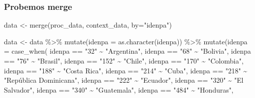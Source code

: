 \documentclass[
  letterpaper,
  DIV=11,
  numbers=noendperiod]{scrartcl}
\newenvironment{Shaded}{\begin{snugshade}}{\end{snugshade}}
\newcommand{\AttributeTok}[1]{\textcolor[rgb]{0.40,0.45,0.13}{#1}}
\newcommand{\FunctionTok}[1]{\textcolor[rgb]{0.28,0.35,0.67}{#1}}
\newcommand{\NormalTok}[1]{\textcolor[rgb]{0.00,0.23,0.31}{#1}}
\newcommand{\OtherTok}[1]{\textcolor[rgb]{0.00,0.23,0.31}{#1}}
\newcommand{\SpecialCharTok}[1]{\textcolor[rgb]{0.37,0.37,0.37}{#1}}
\newcommand{\StringTok}[1]{\textcolor[rgb]{0.13,0.47,0.30}{#1}}
\begin{document}
\subsubsection{Probemos merge}\label{probemos-merge}

\begin{Shaded}
\begin{Highlighting}[]
\NormalTok{data }\OtherTok{\textless{}{-}} \FunctionTok{merge}\NormalTok{(proc\_data, context\_data, }\AttributeTok{by=}\StringTok{"idenpa"}\NormalTok{)}
\end{Highlighting}
\end{Shaded}

\begin{Shaded}
\begin{Highlighting}[]
\NormalTok{data }\OtherTok{\textless{}{-}}\NormalTok{ data }\SpecialCharTok{\%\textgreater{}\%}
  \FunctionTok{mutate}\NormalTok{(}\AttributeTok{idenpa =} \FunctionTok{as.character}\NormalTok{(idenpa)) }\SpecialCharTok{\%\textgreater{}\%}
  \FunctionTok{mutate}\NormalTok{(}\AttributeTok{idenpa =} \FunctionTok{case\_when}\NormalTok{(}
\NormalTok{    idenpa }\SpecialCharTok{==} \StringTok{"32"} \SpecialCharTok{\textasciitilde{}} \StringTok{"Argentina"}\NormalTok{,}
\NormalTok{    idenpa }\SpecialCharTok{==} \StringTok{"68"} \SpecialCharTok{\textasciitilde{}} \StringTok{"Bolivia"}\NormalTok{,}
\NormalTok{    idenpa }\SpecialCharTok{==} \StringTok{"76"} \SpecialCharTok{\textasciitilde{}} \StringTok{"Brasil"}\NormalTok{,}
\NormalTok{    idenpa }\SpecialCharTok{==} \StringTok{"152"} \SpecialCharTok{\textasciitilde{}} \StringTok{"Chile"}\NormalTok{,}
\NormalTok{    idenpa }\SpecialCharTok{==} \StringTok{"170"} \SpecialCharTok{\textasciitilde{}} \StringTok{"Colombia"}\NormalTok{,}
\NormalTok{    idenpa }\SpecialCharTok{==} \StringTok{"188"} \SpecialCharTok{\textasciitilde{}} \StringTok{"Costa Rica"}\NormalTok{,}
\NormalTok{    idenpa }\SpecialCharTok{==} \StringTok{"214"} \SpecialCharTok{\textasciitilde{}} \StringTok{"Cuba"}\NormalTok{,}
\NormalTok{    idenpa }\SpecialCharTok{==} \StringTok{"218"} \SpecialCharTok{\textasciitilde{}} \StringTok{"República Dominicana"}\NormalTok{,}
\NormalTok{    idenpa }\SpecialCharTok{==} \StringTok{"222"} \SpecialCharTok{\textasciitilde{}} \StringTok{"Ecuador"}\NormalTok{,}
\NormalTok{    idenpa }\SpecialCharTok{==} \StringTok{"320"} \SpecialCharTok{\textasciitilde{}} \StringTok{"El Salvador"}\NormalTok{,}
\NormalTok{    idenpa }\SpecialCharTok{==} \StringTok{"340"} \SpecialCharTok{\textasciitilde{}} \StringTok{"Guatemala"}\NormalTok{,}
\NormalTok{    idenpa }\SpecialCharTok{==} \StringTok{"484"} \SpecialCharTok{\textasciitilde{}} \StringTok{"Honduras"}\NormalTok{,}

\end{Highlighting}
\end{Shaded}
\end{document}
